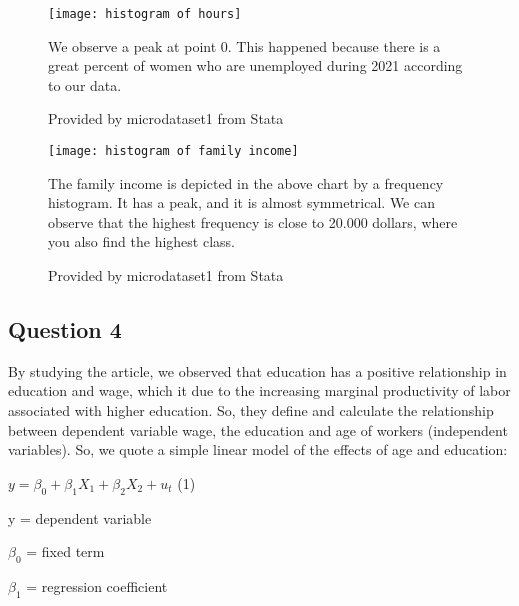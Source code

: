 \documentclass{article}
\begin{document}
\begin{figure}
	\begin{Center}
	\texttt{[image: histogram of hours]}
	\caption{Provided by microdataset1 from Stata}
	\label{fig:histogram of hours}
	\end{Center}
	\vspace {0.5\baselineskip}

	We observe a peak at point 0. This happened because there is a great percent of women who are unemployed during 2021 according to our data. 
\end{figure}
	\vspace {0.5\baselineskip}
	
\begin{figure}
	\begin{Center}
	\texttt{[image: histogram of family income]}
	\caption{Provided by microdataset1 from Stata}
	\label{fig:histogram of family income}
	\end{Center}
	\vspace {0.5\baselineskip}
	
	The family income is depicted in the above chart by a frequency histogram. It has a peak, and it is almost symmetrical. We can observe that the highest frequency is close to 20.000 dollars, where you also find the highest class. 
\end{figure}
	\vspace {0.5\baselineskip}

	\subsection{Question 4}
	\vspace {0.5\baselineskip}
	
	By studying the article, we observed that education has a positive relationship in education and wage, which it due to the increasing marginal productivity of labor associated with higher education. So, they define and calculate the relationship between dependent variable wage, the education and age of workers (independent variables). So, we quote a simple linear model of the effects of age and education: 
	\vspace {0.5\baselineskip}

\begin{Center}
\large $y = \beta_0 + \beta_1  X_1 + \beta_2 X_2 + u_t$ (1)
\end{Center}
	\vspace {0.5\baselineskip}

y = dependent variable
	\vspace {0.5\baselineskip}

$\beta_0$ = fixed term
	\vspace {0.5\baselineskip}
	
$\beta_1$ = regression coefficient
	\vspace {0.5\baselineskip}
	
\end{document}
